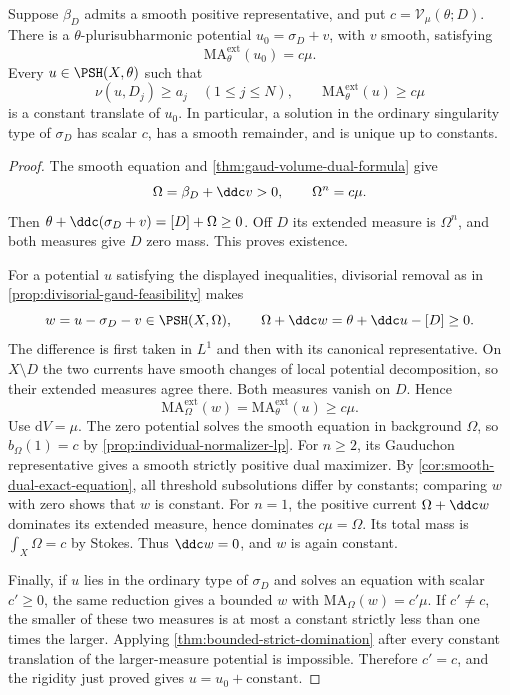 \begin{theorem}\label{thm:divisorial-residual-equation}
Suppose $\beta_D$ admits a smooth positive representative, and put $c=\mathcal V_\mu(\theta;D)$. There is a $\theta$-plurisubharmonic potential $u_0=\sigma_D+v$, with $v$ smooth, satisfying
\[
 \mathrm{MA}^{\mathrm{ext}}_\theta(u_0)=c\mu.
\]
Every $u\in\PSH(X,\theta)$ such that
\[
 \nu(u,D_j)\geq a_j\quad(1\leq j\leq N),\qquad
 \mathrm{MA}^{\mathrm{ext}}_\theta(u)\geq c\mu
\]
is a constant translate of $u_0$. In particular, a solution in the ordinary singularity type of $\sigma_D$ has scalar $c$, has a smooth remainder, and is unique up to constants.
\end{theorem}
\begin{proof}
The smooth equation and \cref{thm:gaud-volume-dual-formula} give
\[
 \Omega=\beta_D+\ddc v>0,\qquad \Omega^n=c\mu.
\]
Then $\theta+\ddc(\sigma_D+v)=[D]+\Omega\geq0$. Off $D$ its extended measure is $\Omega^n$, and both measures give $D$ zero mass. This proves existence.

For a potential $u$ satisfying the displayed inequalities, divisorial removal as in \cref{prop:divisorial-gaud-feasibility} makes
\[
 w=u-\sigma_D-v\in\PSH(X,\Omega),\qquad
 \Omega+\ddc w=\theta+\ddc u-[D]\geq0.
\]
The difference is first taken in $L^1$ and then with its canonical representative. On $X\setminus D$ the two currents have smooth changes of local potential decomposition, so their extended measures agree there. Both measures vanish on $D$. Hence
\[
 \mathrm{MA}^{\mathrm{ext}}_\Omega(w)
       =\mathrm{MA}^{\mathrm{ext}}_\theta(u)\geq c\mu.
\]
Use $\mathrm{d}V=\mu$. The zero potential solves the smooth equation in background $\Omega$, so $b_\Omega(1)=c$ by \cref{prop:individual-normalizer-lp}. For $n\geq2$, its Gauduchon representative gives a smooth strictly positive dual maximizer. By \cref{cor:smooth-dual-exact-equation}, all threshold subsolutions differ by constants; comparing $w$ with zero shows that $w$ is constant. For $n=1$, the positive current $\Omega+\ddc w$ dominates its extended measure, hence dominates $c\mu=\Omega$. Its total mass is $\int_X\Omega=c$ by Stokes. Thus $\ddc w=0$, and $w$ is again constant.

Finally, if $u$ lies in the ordinary type of $\sigma_D$ and solves an equation with scalar $c'\geq0$, the same reduction gives a bounded $w$ with $\mathrm{MA}_\Omega(w)=c'\mu$. If $c'\ne c$, the smaller of these two measures is at most a constant strictly less than one times the larger. Applying \cref{thm:bounded-strict-domination} after every constant translation of the larger-measure potential is impossible. Therefore $c'=c$, and the rigidity just proved gives $u=u_0+\mathrm{constant}$.
\end{proof}
